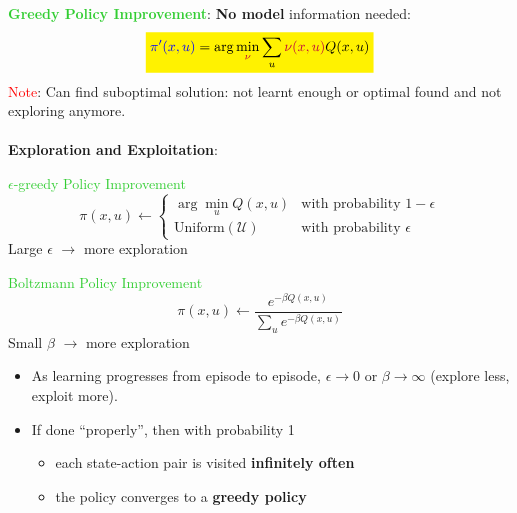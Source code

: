 \begin{tcolorbox}[colframe=cyan!50!black, colback=cyan!5!white, title=Policy Iteration]
\textbf{\textcolor{LimeGreen}{Greedy Policy Improvement}}: \textbf{No model} information needed:
\[
\stabilo{{\color{blue}\pi'(x, u)} = \arg \min_{\textcolor{purple}{\nu}} \sum_{u} \textcolor{purple}{\nu(x, u)} Q(x,u)}
\]
\textcolor{red}{Note}: Can find suboptimal solution: not learnt enough or optimal found and not exploring anymore.\\ \\
\textbf{Exploration and Exploitation}:\\
\begin{minipage}[t]{0.58\textwidth}
    \textcolor{LimeGreen}{$\epsilon$-greedy Policy Improvement}
    \[
    \pi(x, u) \gets
    \begin{cases}
    \arg \underset{u}{\min} Q(x, u) & \text{with probability } 1 - \epsilon \\
    \text{Uniform}(\mathcal{U}) & \text{with probability } \epsilon
    \end{cases}
    \]
    Large $\epsilon$ $\rightarrow$ more exploration
\end{minipage}
\begin{minipage}[t]{0.38\textwidth}
    \textcolor{LimeGreen}{Boltzmann Policy Improvement}
    \[
    \pi(x, u) \gets \frac{e^{-\beta Q(x, u)}}{\sum_{u} e^{-\beta Q(x, u)}}
    \]
    Small $\beta$ $\rightarrow$ more exploration
\end{minipage}
\begin{itemize}
    \item As learning progresses from episode to episode, $\epsilon \rightarrow 0$ or $\beta \rightarrow \infty$ (explore less, exploit more).
    \item If done “properly”, then with probability 1
    \begin{itemize}
        \item each state-action pair is visited \textbf{infinitely often}
        \item the policy converges to a \textbf{greedy policy}
    \end{itemize}
\end{itemize}
\end{tcolorbox}

\newpage

